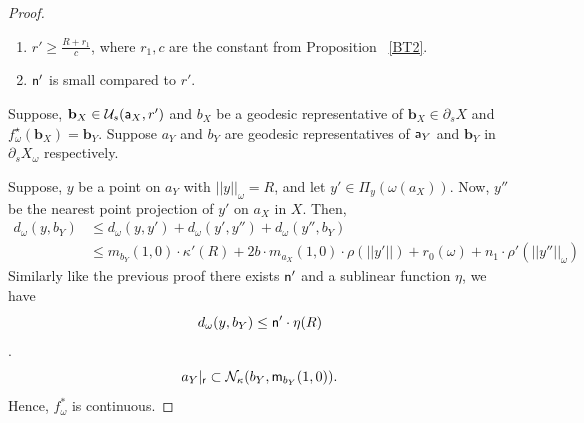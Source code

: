 \documentclass[12 pt]{amsart}
\newcommand{\calN}{\mathcal{N}}
\newcommand{\calU}{\mathcal{U}}
\newcommand{\calV}{\mathcal{V}}
\newcommand{\bfa}{\textbf{a}}
\newcommand{\bfb}{\textbf{b}}
\theoremstyle{definition}
\theoremstyle{remark}
\renewcommand{\bfa}{{\sf a}}
\newcommand{\mm}{{\sf m}}
\newcommand{\nn}{{\sf n}}
\newcommand{\rr}{{\sf r}}
\begin{document}
\begin{proof}
\begin{enumerate}
    \item $r' \geq \frac{R+r_1}{c}$, where $r_1, c$ are the constant from Proposition ~\ref{BT2}.
    \item $\nn'$ is small compared to $r'$.
    \end{enumerate}
Suppose, $\bfb_X \in \calU_s(\bfa_X,r')$ and $b_X$ be a geodesic representative of $\bfb_X \in \partial_sX$ and $f_\omega^\star(\bfb_X)=\bfb_Y.$ 
Suppose $a_Y$ and $b_Y$ are geodesic representatives of $\bfa_Y$ and $\bfb_Y$ in $\partial_sX_{\omega}$ respectively.  

Suppose, $y$ be a point on $a_Y$ with $||y||_\omega=R$, and let $y' \in \Pi_y(\omega(a_X))$. Now, $y''$ be the nearest point projection of $y'$ on $a_X$ in $X$. Then,
\begin{align*}
  d_\omega(y, b_Y) & \leq d_\omega(y,y')+d_\omega(y',y'')+d_\omega(y'',b_Y)\\
  &\leq m_{b_Y}(1,0) \cdot \kappa'(R)+ 2b\cdot m_{a_X}(1,0) \cdot \rho(||y'||)+ r_0(\omega)+ n_1 \cdot \rho'(||y''||_\omega)  
\end{align*}
Similarly like the previous proof there exists $\nn'$ and a sublinear function $\eta$, we have \[d_\omega(y, b_Y) \leq \nn' \cdot \eta(R)\].
\[
a_Y|_\rr \subset \calN_\kappa(b_Y, \mm_{b_Y}(1,0)). 
\]
Hence, $f_\omega^*$ is continuous. 





\end{proof}
\end{document}
